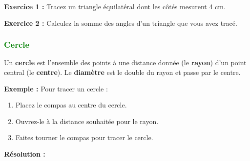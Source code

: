 \documentclass{article}
\begin{document}
\vspace{0.2cm}

\begin{tcolorbox}[colback=yellow!10!white, colframe=yellow!75!black, title=\textcolor{white}{Exercices}, sharp corners=south]
    \textbf{Exercice 1 :} Tracez un triangle équilatéral dont les côtés mesurent 4 cm.

    \textbf{Exercice 2 :} Calculez la somme des angles d’un triangle que vous avez tracé.
\end{tcolorbox}

\vspace{0.5cm}

\subsubsection{\textcolor{green}{Cercle}}

\begin{tcolorbox}[colback=red!10!white, colframe=red!75!black, title=\textcolor{white}{Définitions}, sharp corners=south]
    Un \textbf{cercle} est l'ensemble des points à une distance donnée (le \textbf{rayon}) d'un point central (le \textbf{centre}).
    Le \textbf{diamètre} est le double du rayon et passe par le centre.
\end{tcolorbox}

\vspace{0.2cm}

\begin{tcolorbox}[colback=orange!10!white, colframe=orange!75!black, title=\textcolor{white}{Exemple de traçage}, sharp corners=south]
    \textbf{Exemple :} Pour tracer un cercle :
    \begin{enumerate}
        \item Placez le compas au centre du cercle.
        \item Ouvrez-le à la distance souhaitée pour le rayon.
        \item Faites tourner le compas pour tracer le cercle.
    \end{enumerate}
\end{tcolorbox}

\textbf{Résolution :}
\end{document}
